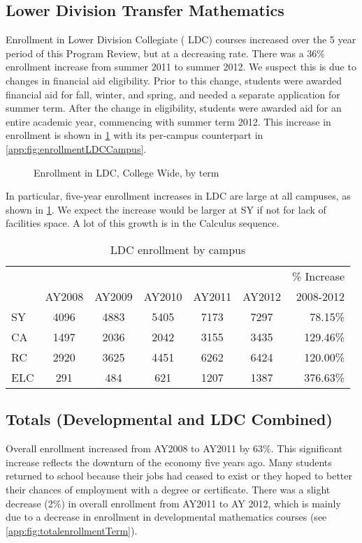 \subsection{Lower Division Transfer Mathematics}
Enrollment in Lower Division Collegiate ( LDC) courses increased over the 5
year period of this Program Review, but at a decreasing rate. There was a 36\%
enrollment increase from summer 2011 to summer 2012. We suspect this is due to
changes in financial aid eligibility. Prior to this change, students were
awarded financial aid for fall, winter, and spring, and needed a separate
application for summer term.  After the change in eligibility, students were
awarded aid for an entire academic year, commencing with summer term 2012.
This increase in enrollment is shown in \cref{needs:fig:enrollmentLDCTerm} with
its per-campus counterpart in \vref{app:fig:enrollmentLDCCampus}.

\begin{figure}[!htb]
	\centering
	
	\caption{Enrollment in LDC, College Wide, by term}
	\label{needs:fig:enrollmentLDCTerm}
\end{figure}

In particular, five-year enrollment increases  in LDC are large at all
campuses, as shown in \cref{needs:tab:LDCenrollmentCampus}.  We expect the
increase would be larger at SY if not for lack of facilities space. A lot of
this growth is in the Calculus sequence.   

\begin{table}[!htb]
	\centering
	\caption{LDC enrollment by campus}
	\label{needs:tab:LDCenrollmentCampus}
	\begin{tabular}{l*{5}{c}r}
		\toprule
		    &        &        &        &        &        & \% Increase \\
		    & AY2008 & AY2009 & AY2010 & AY2011 & AY2012 & 2008-2012   \\
		\midrule
		SY  & 4096   & 4883   & 5405   & 7173   & 7297   & 78.15\%     \\
		CA  & 1497   & 2036   & 2042   & 3155   & 3435   & 129.46\%    \\
		RC  & 2920   & 3625   & 4451   & 6262   & 6424   & 120.00\%    \\
		ELC & 291    & 484    & 621    & 1207   & 1387   & 376.63\%    \\
		\bottomrule
	\end{tabular}
\end{table}

\subsection{Totals (Developmental and LDC Combined)}
Overall enrollment increased from AY2008 to AY2011 by 63\%. This significant
increase reflects the downturn of the economy five years ago. Many students
returned to school because their jobs had ceased to exist or they hoped to
better their chances of employment with a degree or certificate. There was a
slight decrease (2\%) in overall enrollment from AY2011 to AY 2012, which is
mainly due to a decrease in enrollment in developmental mathematics courses
(see \vref{app:fig:totalenrollmentTerm}).

